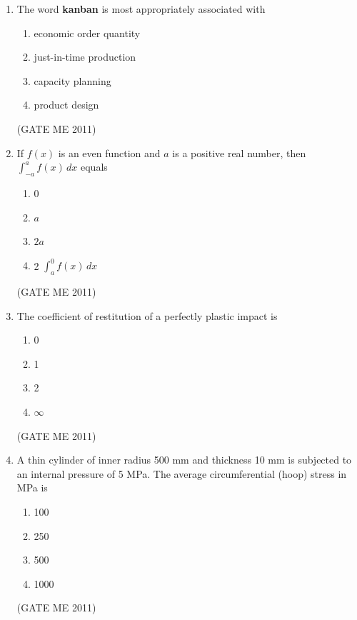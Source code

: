 \documentclass[journal]{IEEEtran}
\begin{document}
\begin{enumerate}
\item The word \textbf{kanban} is most appropriately associated with
\begin{multicols}{2}
\begin{enumerate}
\item economic order quantity  
\item just-in-time production  
\item capacity planning  
\item product design  
\end{enumerate}
\end{multicols}   
\hfill (GATE ME 2011)  

\item If $f(x)$ is an even function and $a$ is a positive real number, then $\int_{-a}^{a} f(x)\,dx$ equals
\begin{multicols}{4}
\begin{enumerate}
\item 0  
\item $a$  
\item $2a$  
\item 2 $\int_{a}^{0} f(x)\,dx$   
\end{enumerate}
\end{multicols}   
\hfill (GATE ME 2011)  

\item The coefficient of restitution of a perfectly plastic impact is
\begin{multicols}{4}
\begin{enumerate}
\item 0  
\item 1  
\item 2  
\item $\infty$
\end{enumerate}
\end{multicols}   
\hfill (GATE ME 2011)  

\item A thin cylinder of inner radius 500 mm and thickness 10 mm is subjected to an internal pressure of 5 MPa. The average circumferential (hoop) stress in MPa is
\begin{multicols}{4}
\begin{enumerate}
\item 100  
\item 250  
\item 500  
\item 1000  
\end{enumerate}
\end{multicols}  
\hfill (GATE ME 2011)  


\end{enumerate}
\end{document}
